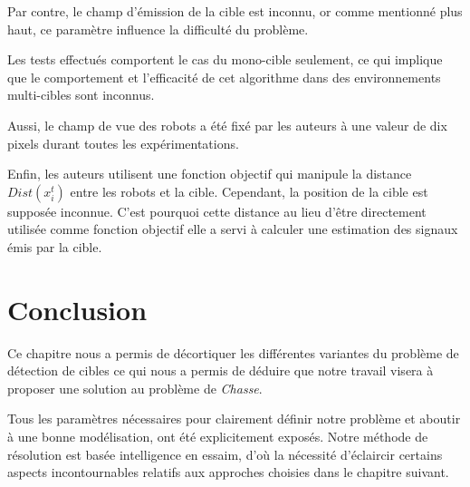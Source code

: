 Par contre, le champ d’émission de la cible est inconnu, or comme mentionné plus haut, ce paramètre influence la difficulté du problème.
 
Les tests effectués comportent le cas du mono-cible seulement, ce qui implique que le comportement et l’efficacité de cet algorithme dans des environnements multi-cibles sont inconnus. 

Aussi, le champ de vue des robots a été fixé par les auteurs à une valeur de dix pixels durant toutes les expérimentations. 

Enfin, les auteurs utilisent une fonction objectif qui manipule la distance $ Dist \left( x^{t}_{i} \right)$ entre les robots et la cible. Cependant, la position de la cible est supposée inconnue. C’est pourquoi cette distance au lieu d’être directement utilisée comme fonction objectif elle a servi à calculer une estimation des signaux émis par la cible. 





\section{Conclusion}
Ce chapitre nous a permis de décortiquer les différentes variantes du problème de détection de cibles ce qui nous a permis de déduire que notre travail visera à proposer une solution au problème de \textit{Chasse}.

 Tous les paramètres nécessaires pour clairement définir notre problème et aboutir à une bonne modélisation, ont été explicitement exposés.
Notre méthode de résolution est basée intelligence en essaim, d’où la nécessité d'éclaircir certains aspects incontournables relatifs aux approches choisies dans le chapitre suivant.
